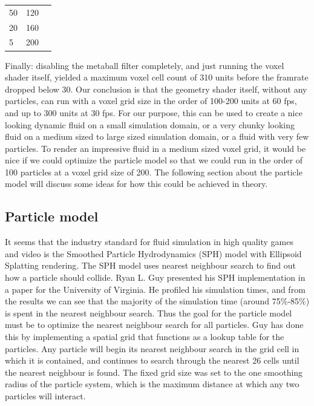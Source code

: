 \documentclass{article}
\begin{document}
\begin{multicols}{2}
        \begin{tabular}{ l | c | r }
          50 & 120 \\
          20 & 160 \\
          5 & 200 \\
        \end{tabular}

        Finally: disabling the metaball filter completely, and just running the voxel shader itself, yielded a maximum voxel cell count of 310 units before the framrate dropped below 30.
        Our conclusion is that the geometry shader itself, without any particles, can run with a voxel grid size in the order of 100-200 units at 60 fps, and up to 300 units at 30 fps.
        For our purpose, this can be used to create a nice looking dynamic fluid on a small simulation domain, or a very chunky looking fluid on a medium sized to large sized simulation domain, or a fluid with very few particles.
        To render an impressive fluid in a medium sized voxel grid, it would be nice if we could optimize the particle model so that we could run in the order of 100 particles at a voxel grid size of 200.
        The following section about the particle model will discuss some ideas for how this could be achieved in theory.

        \subsection{Particle model}
        It seems that the industry standard for fluid simulation in high quality games and video is the Smoothed Particle Hydrodynamics (SPH) model with Ellipsoid Splatting rendering.
        The SPH model uses nearest neighbour search to find out how a particle should collide.
        Ryan L. Guy presented his SPH implementation in a paper for the University of Virginia. He profiled his simulation times, and from the results we can see that the majority of the simulation time (around 75\%-85\%) is spent in the nearest neighbour search.
        Thus the goal for the particle model must be to optimize the nearest neighbour search for all particles.
        Guy has done this by implementing a spatial grid that functions as a lookup table for the particles.
        Any particle will begin its nearest neighbour search in the grid cell in which it is contained, and continues to search through the nearest 26 cells until the nearest neighbour is found.
        The fixed grid size was set to the one smoothing radius of the particle system, which is the maximum distance at which any two particles will interact.
        \cite{guy15}


\end{multicols}
\end{document}
